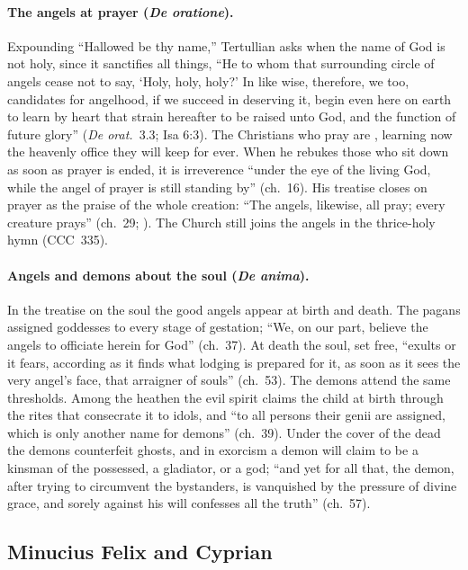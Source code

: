 \paragraph{The angels at prayer (\emph{De oratione}).} Expounding ``Hallowed
be thy name,'' Tertullian asks when the name of God is not holy, since it
sanctifies all things, ``He to whom that surrounding circle of angels
cease not to say, `Holy, holy, holy?' In like wise, therefore, we too,
candidates for angelhood, if we succeed in deserving it, begin even here
on earth to learn by heart that strain hereafter to be raised unto God,
and the function of future glory'' (\emph{De orat.}\ 3.3; Isa 6:3). The
Christians who pray are , learning now
the heavenly office they will keep for ever. When he rebukes those who sit
down as soon as prayer is ended, it is irreverence ``under the eye of the
living God, while the angel of prayer is still standing by'' (ch.~16). His
treatise closes on prayer as the praise of the whole creation: ``The
angels, likewise, all pray; every creature prays'' (ch.~29; ). The Church still joins the angels in the thrice-holy
hymn (CCC~335).

\paragraph{Angels and demons about the soul (\emph{De anima}).} In the
treatise on the soul the good angels appear at birth and death. The pagans
assigned goddesses to every stage of gestation; ``We, on our part, believe
the angels to officiate herein for God'' (ch.~37). At death the soul, set
free, ``exults or it fears, according as it finds what lodging is prepared
for it, as soon as it sees the very angel's face, that arraigner of
souls'' (ch.~53). The demons attend the same thresholds. Among the heathen
the evil spirit claims the child at birth through the rites that
consecrate it to idols, and ``to all persons their genii are assigned,
which is only another name for demons'' (ch.~39). Under the cover of the
dead the demons counterfeit ghosts, and in exorcism a demon will claim to
be a kinsman of the possessed, a gladiator, or a god; ``and yet for all
that, the demon, after trying to circumvent the bystanders, is vanquished
by the pressure of divine grace, and sorely against his will confesses all
the truth'' (ch.~57).

\sectionguard
\subsection{Minucius Felix and Cyprian}\label{sec:fl-minucius-cyprian}

